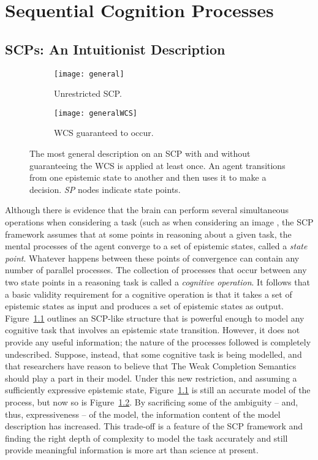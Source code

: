 \chapter{Sequential Cognition Processes} \label{chp:scp}
\section{SCPs: An Intuitionist Description} \label{ssec:intu}
\begin{figure*}
\begin{subfigure}{.35\textwidth}
  \centering
  \texttt{[image: general]}
  \caption{Unrestricted SCP.}
  \label{fig:scp_general}
\end{subfigure}%
\begin{subfigure}{.65\textwidth}
  \centering
  \texttt{[image: generalWCS]}
  \caption{WCS guaranteed to occur.}
  \label{fig:sfig2}
\end{subfigure}
\caption{The most general description on an SCP with and without guaranteeing the WCS is applied at least once. An agent transitions from one epistemic state to another and then uses it to make a decision. \textit{SP} nodes indicate state points.}
\label{fig:scp_generalWCS}
\end{figure*}

Although there is evidence that the brain can perform several simultaneous operations when considering a task (such as when considering an image \citep{sigman2008brain}, the SCP framework assumes that at some points in reasoning about a given task, the mental processes of the agent converge to a set of epistemic states, called a \textit{state point}. Whatever happens between these points of convergence can contain any number of parallel processes. The collection of processes that occur between any two state points in a reasoning task is called a \textit{cognitive operation}. It follows that a basic validity requirement for a cognitive operation is that it takes a set of epistemic states as input and produces a set of epistemic states as output. Figure~\ref{fig:scp_general} outlines an SCP-like structure that is powerful enough to model any cognitive task that involves an epistemic state transition. However, it does not provide any useful information; the nature of the processes followed is completely undescribed. Suppose, instead, that some cognitive task is being modelled, and that researchers have reason to believe that The Weak Completion Semantics should play a part in their model. Under this new restriction, and assuming a sufficiently expressive epistemic state, Figure~\ref{fig:scp_general} is still an accurate model of the process, but now so is Figure~\ref{fig:sfig2}. By sacrificing some of the ambiguity -- and, thus, expressiveness -- of the model, the information content of the model description has increased. This trade-off is a feature of the SCP framework and finding the right depth of complexity to model the task accurately and still provide meaningful information is more art than science at present. 

